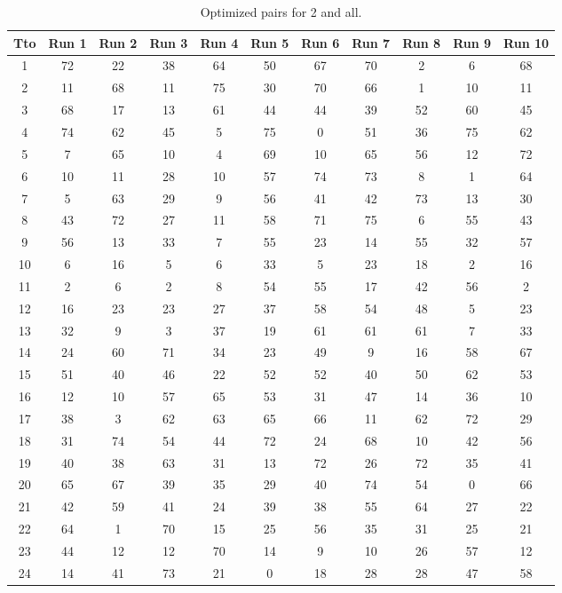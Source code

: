 \begin{table}
  \centering
  \scriptsize
  \caption{Optimized pairs for 2 and all.}
  \label{tab_pairs}
\begin{tabular}{c c c c c c c c c c c }
\hline
Tto & Run 1 & Run 2 & Run 3 & Run 4 & Run 5 & Run 6 & Run 7 & Run 8 & Run 9 & Run 10 \\
\hline
1 & 72 & 22 & 38 & 64 & 50 & 67 & 70 & 2 & 6 & 68 \\
2 & 11 & 68 & 11 & 75 & 30 & 70 & 66 & 1 & 10 & 11 \\
3 & 68 & 17 & 13 & 61 & 44 & 44 & 39 & 52 & 60 & 45 \\
4 & 74 & 62 & 45 & 5 & 75 & 0 & 51 & 36 & 75 & 62 \\
5 & 7 & 65 & 10 & 4 & 69 & 10 & 65 & 56 & 12 & 72 \\
6 & 10 & 11 & 28 & 10 & 57 & 74 & 73 & 8 & 1 & 64 \\
7 & 5 & 63 & 29 & 9 & 56 & 41 & 42 & 73 & 13 & 30 \\
8 & 43 & 72 & 27 & 11 & 58 & 71 & 75 & 6 & 55 & 43 \\
9 & 56 & 13 & 33 & 7 & 55 & 23 & 14 & 55 & 32 & 57 \\
10 & 6 & 16 & 5 & 6 & 33 & 5 & 23 & 18 & 2 & 16 \\
11 & 2 & 6 & 2 & 8 & 54 & 55 & 17 & 42 & 56 & 2 \\
12 & 16 & 23 & 23 & 27 & 37 & 58 & 54 & 48 & 5 & 23 \\
13 & 32 & 9 & 3 & 37 & 19 & 61 & 61 & 61 & 7 & 33 \\
14 & 24 & 60 & 71 & 34 & 23 & 49 & 9 & 16 & 58 & 67 \\
15 & 51 & 40 & 46 & 22 & 52 & 52 & 40 & 50 & 62 & 53 \\
16 & 12 & 10 & 57 & 65 & 53 & 31 & 47 & 14 & 36 & 10 \\
17 & 38 & 3 & 62 & 63 & 65 & 66 & 11 & 62 & 72 & 29 \\
18 & 31 & 74 & 54 & 44 & 72 & 24 & 68 & 10 & 42 & 56 \\
19 & 40 & 38 & 63 & 31 & 13 & 72 & 26 & 72 & 35 & 41 \\
20 & 65 & 67 & 39 & 35 & 29 & 40 & 74 & 54 & 0 & 66 \\
21 & 42 & 59 & 41 & 24 & 39 & 38 & 55 & 64 & 27 & 22 \\
22 & 64 & 1 & 70 & 15 & 25 & 56 & 35 & 31 & 25 & 21 \\
23 & 44 & 12 & 12 & 70 & 14 & 9 & 10 & 26 & 57 & 12 \\
24 & 14 & 41 & 73 & 21 & 0 & 18 & 28 & 28 & 47 & 58 \\

\end{tabular}
\end{table}
